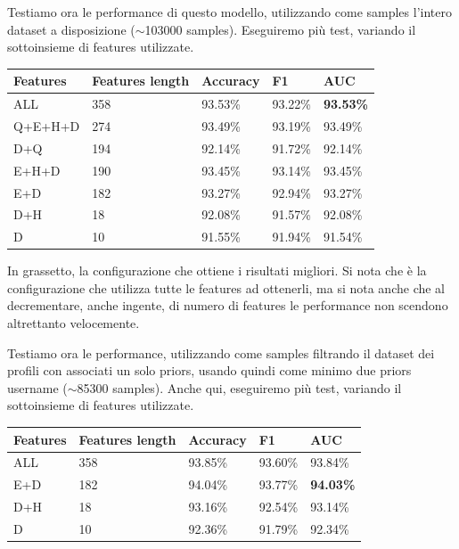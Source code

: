 Testiamo ora le performance di questo modello, utilizzando come samples l'intero dataset a disposizione ($\sim$103000 samples). Eseguiremo più test, variando il sottoinsieme di features utilizzate.\newline

\begin{tabular}{ |l|l|l|l|l| }
	\hline
	\textbf{Features} & \textbf{Features length} & \textbf{Accuracy} & \textbf{F1}  & \textbf{AUC} \\ \hline
	ALL & 358 & 93.53\% & 93.22\% & \textbf{93.53\%} \\ \hline
	Q+E+H+D & 274 & 93.49\% & 93.19\% & 93.49\% \\ \hline
	D+Q & 194 & 92.14\% & 91.72\% & 92.14\% \\ \hline
	E+H+D & 190 & 93.45\% & 93.14\% & 93.45\% \\ \hline
	E+D & 182 & 93.27\% & 92.94\% & 93.27\% \\ \hline
	D+H & 18 & 92.08\% & 91.57\% & 92.08\% \\ \hline
	D & 10 & 91.55\% & 91.94\% & 91.54\% \\
	\hline
\end{tabular}
\newline\newline

In grassetto, la configurazione che ottiene i risultati migliori. Si nota che è la configurazione che utilizza tutte le features ad ottenerli, ma si nota anche che al decrementare, anche ingente, di numero di features le performance non scendono altrettanto velocemente.\newline

Testiamo ora le performance, utilizzando come samples filtrando il dataset dei profili con associati un solo priors, usando quindi come minimo due priors username ($\sim$85300 samples). Anche qui, eseguiremo più test, variando il sottoinsieme di features utilizzate.\newline


\begin{tabular}{ |l|l|l|l|l| }
	\hline
	\textbf{Features} & \textbf{Features length} & \textbf{Accuracy} & \textbf{F1}  & \textbf{AUC} \\ \hline
	ALL & 358 & 93.85\% & 93.60\% & 93.84\% \\ \hline
	E+D & 182 & 94.04\% & 93.77\% & \textbf{94.03\%} \\ \hline
	D+H & 18 & 93.16\% & 92.54\% & 93.14\% \\ \hline
	D & 10 & 92.36\% & 91.79\% & 92.34\% \\
	\hline
\end{tabular}
\newline\newline


